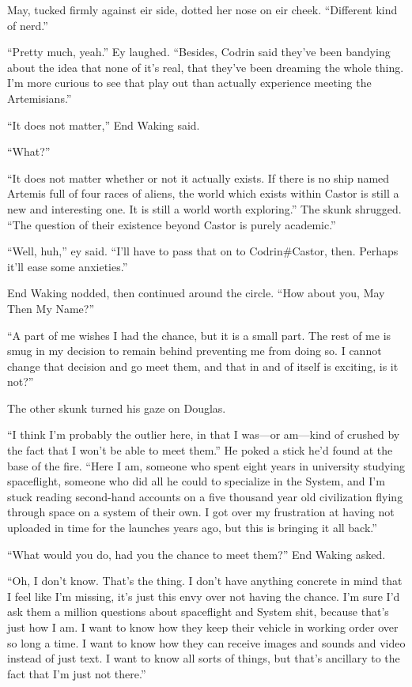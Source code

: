 May, tucked firmly against eir side, dotted her nose on eir cheek. ``Different kind of nerd.''

``Pretty much, yeah.'' Ey laughed. ``Besides, Codrin said they've been bandying about the idea that none of it's real, that they've been dreaming the whole thing. I'm more curious to see that play out than actually experience meeting the Artemisians.''

``It does not matter,'' End Waking said.
 
``What?''
 
``It does not matter whether or not it actually exists. If there is no ship named Artemis full of four races of aliens, the world which exists within Castor is still a new and interesting one. It is still a world worth exploring.'' The skunk shrugged. ``The question of their existence beyond Castor is purely academic.''
 
``Well, huh,'' ey said. ``I'll have to pass that on to Codrin\#Castor, then. Perhaps it'll ease some anxieties.''
 
End Waking nodded, then continued around the circle. ``How about you, May Then My Name?''

``A part of me wishes I had the chance, but it is a small part. The rest of me is smug in my decision to remain behind preventing me from doing so. I cannot change that decision and go meet them, and that in and of itself is exciting, is it not?''

The other skunk turned his gaze on Douglas.

``I think I'm probably the outlier here, in that I was—or am—kind of crushed by the fact that I won't be able to meet them.''  He poked a stick he'd found at the base of the fire. ``Here I am, someone who spent eight years in university studying spaceflight, someone who did all he could to specialize in the System, and I'm stuck reading second-hand accounts on a five thousand year old civilization flying through space on a system of their own. I got over my frustration at having not uploaded in time for the launches years ago, but this is bringing it all back.''

``What would you do, had you the chance to meet them?'' End Waking asked.

``Oh, I don't know. That's the thing. I don't have anything concrete in mind that I feel like I'm missing, it's just this envy over not having the chance. I'm sure I'd ask them a million questions about spaceflight and System shit, because that's just how I am. I want to know how they keep their vehicle in working order over so long a time. I want to know how they can receive images and sounds and video instead of just text. I want to know all sorts of things, but that's ancillary to the fact that I'm just not there.''

